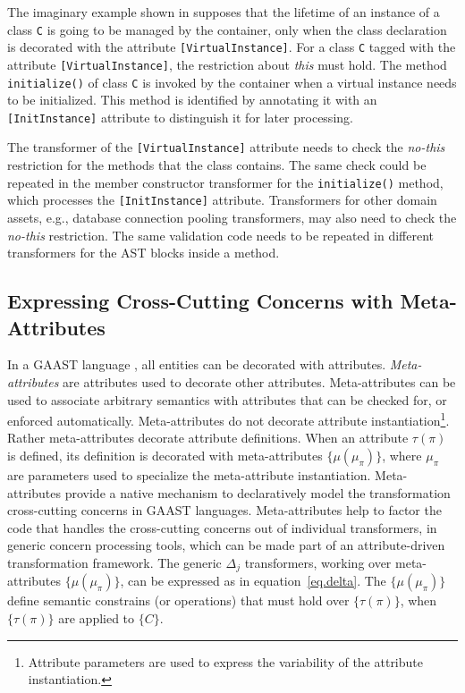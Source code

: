 The imaginary example shown in  supposes that the lifetime of an instance of a class \texttt{C} is going to be managed by the container, only when the class declaration is decorated with the attribute \texttt{[Vir\-tual\-Insta\-nce]}. For a class \texttt{C} tagged with the attribute \texttt{[Vir\-tual\-Insta\-nce]}, the restriction about \textit{this} must hold. The method \texttt{initialize()} of class \texttt{C} is invoked by the container when a virtual instance needs to be initialized. This method is identified by annotating it with an \texttt{[Init\-Instan\-ce]} attribute to distinguish it for later processing.

The transformer of the \texttt{[Vir\-tualInsta\-nce]} attribute needs to check the \textit{no-this} restriction for the methods that the class contains. The same check could be repeated in the member constructor transformer for the \texttt{initialize()} method, which processes the \texttt{[Init\-Instan\-ce]} attribute. Transformers for other domain assets, e.g., database connection pooling transformers, may also need to check the \textit{no-this} restriction. The same validation code needs to be repeated in different transformers for the AST blocks inside a method.

\subsection{Expressing Cross-Cutting Concerns with Meta-Attributes}

In a GAAST language , all entities can be decorated with attributes. \textit{Meta-attributes} are attributes used to decorate other attributes. Meta-attributes can be used to associate arbitrary semantics with attributes that can be checked for, or enforced automatically. Meta-attributes do not decorate attribute instantiation\footnote{Attribute parameters  are used to express the variability of the attribute instantiation.}. Rather meta-attributes decorate attribute definitions. When an attribute $\tau(\pi)$ is defined, its definition is decorated with meta-attributes $\{\mu(\mu_{\pi})\}$, where $\mu_{\pi}$ are parameters used to specialize the meta-attribute instantiation. 
%
Meta-attributes provide a native mechanism to declaratively model the transformation cross-cutting concerns in GAAST languages. Meta-attributes help to factor the code that handles the cross-cutting concerns out of individual transformers, in generic concern processing tools, which can be made part of an attribute-driven transformation framework. The generic $\Delta_j$ transformers, working over meta-attributes $\{\mu(\mu_{\pi})\}$, can be expressed as in equation~\ref{eq.delta}. The $\{\mu(\mu_{\pi})\}$ define semantic constrains (or operations) that must hold over $\{\tau(\pi)\}$, when $\{\tau(\pi)\}$ are applied to $\{C\}$.

